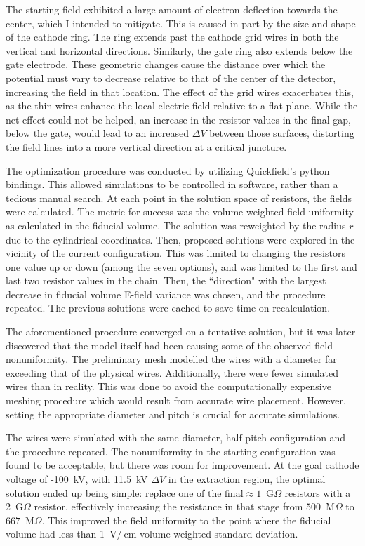 The starting field exhibited a large amount of electron deflection towards the center, which I intended to mitigate.
This is caused in part by the size and shape of the cathode ring. 
The ring extends past the cathode grid wires in both the vertical and horizontal directions. 
Similarly, the gate ring also extends below the gate electrode.
These geometric changes cause the distance over which the potential must vary to decrease relative to that of the center of the detector, increasing the field in that location.
The effect of the grid wires exacerbates this, as the thin wires enhance the local electric field relative to a flat plane.
While the net effect could not be helped, an increase in the resistor values in the final gap, below the gate, would lead to an increased $\Delta V$ between those surfaces, distorting the field lines into a more vertical direction at a critical juncture.

The optimization procedure was conducted by utilizing  Quickfield's python bindings. 
This allowed simulations to be controlled in software, rather than a tedious manual search.
At each point in the solution space of resistors, the fields were calculated.
The metric for success was the volume-weighted field uniformity as calculated in the fiducial volume.
The solution was reweighted by the radius $r$ due to the cylindrical coordinates.
Then, proposed solutions were explored in the vicinity of the current configuration.
This was limited to changing the resistors one value up or down (among the seven options), and was limited to the first and last two resistor values in the chain.
Then, the ``direction" with the largest decrease in fiducial volume E-field variance was chosen, and the procedure repeated.
The previous solutions were cached to save time on recalculation.

The aforementioned procedure converged on a tentative solution, but it was later discovered that the model itself had been causing some of the observed field nonuniformity.
The preliminary mesh modelled the wires with a diameter far exceeding that of the physical wires. 
Additionally, there were fewer simulated wires than in reality.
This was done to avoid the computationally expensive meshing procedure  which would result from accurate wire placement.
However, setting the appropriate diameter and pitch is crucial for accurate simulations.

The wires were simulated with the same diameter, half-pitch configuration and the procedure repeated. 
The nonuniformity in the starting configuration was found to be acceptable, but there was room for improvement.
At the goal cathode voltage of -100~kV, with 11.5~kV $\Delta V$ in the extraction region, the optimal solution ended up being simple: replace one of the final$\approx 1$~G$\Omega$ resistors with a 2~G$\Omega$ resistor, effectively increasing the resistance in that stage from $500$~M$\Omega$ to $667$~M$\Omega$.
This improved the field uniformity to the point where the fiducial volume had less than 1~$\mathrm{V}/\mathrm{~cm}$ volume-weighted standard deviation.

